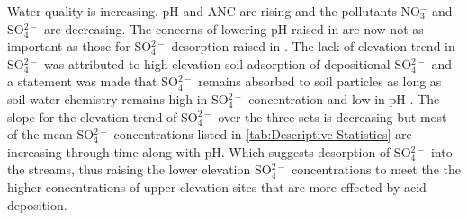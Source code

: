 Water quality is increasing.  
pH and ANC are rising and the pollutants NO$_3^-$ and SO$_4^{2-}$ are decreasing.  
The concerns of lowering pH raised in \citet{robinson2008ph} are now not as important as those for SO$_4^{2-}$ desorption raised in \citet{cai2013}.  
The lack of elevation trend in SO$_4^{2-}$ was attributed to high elevation soil adsorption of depositional SO$_4^{2-}$ and a statement was made that SO$_4^{2-}$ remains absorbed to soil particles as long as soil water chemistry remains high in SO$_4^{2-}$ concentration and low in pH \citep{cai2011long}.  
The slope for the elevation trend of SO$_4^{2-}$ over the three sets is decreasing but most of the mean SO$_4^{2-}$ concentrations listed in \autoref{tab:Descriptive Statistics} are increasing through time along with pH.
Which suggests desorption of SO$_4^{2-}$ into the streams, thus raising the lower elevation SO$_4^{2-}$ concentrations to meet the the higher concentrations of upper elevation sites that are more effected by acid deposition.


  

